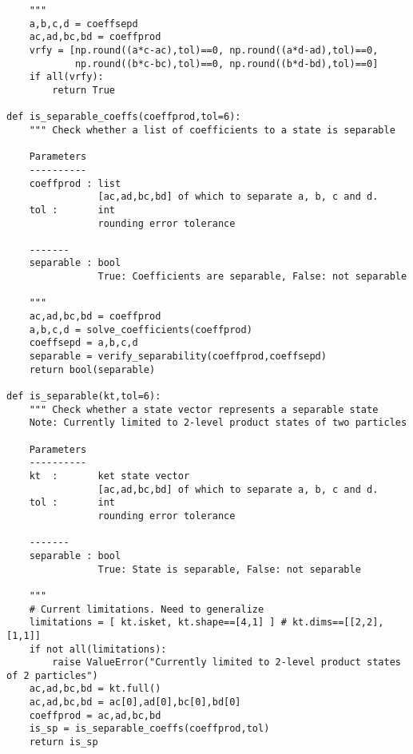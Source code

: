 \begin{verbatim}
    """
    a,b,c,d = coeffsepd
    ac,ad,bc,bd = coeffprod
    vrfy = [np.round((a*c-ac),tol)==0, np.round((a*d-ad),tol)==0,
            np.round((b*c-bc),tol)==0, np.round((b*d-bd),tol)==0]
    if all(vrfy):
        return True
        
def is_separable_coeffs(coeffprod,tol=6):
    """ Check whether a list of coefficients to a state is separable
    
    Parameters
    ----------
    coeffprod : list
                [ac,ad,bc,bd] of which to separate a, b, c and d.
    tol :       int
                rounding error tolerance
    
    -------
    separable : bool
                True: Coefficients are separable, False: not separable
    
    """
    ac,ad,bc,bd = coeffprod
    a,b,c,d = solve_coefficients(coeffprod)
    coeffsepd = a,b,c,d
    separable = verify_separability(coeffprod,coeffsepd)
    return bool(separable)
    
def is_separable(kt,tol=6):
    """ Check whether a state vector represents a separable state
    Note: Currently limited to 2-level product states of two particles
    
    Parameters
    ----------
    kt  :       ket state vector
                [ac,ad,bc,bd] of which to separate a, b, c and d.
    tol :       int
                rounding error tolerance
    
    -------
    separable : bool
                True: State is separable, False: not separable
    
    """
    # Current limitations. Need to generalize
    limitations = [ kt.isket, kt.shape==[4,1] ] # kt.dims==[[2,2],[1,1]]
    if not all(limitations):
        raise ValueError("Currently limited to 2-level product states of 2 particles")
    ac,ad,bc,bd = kt.full()
    ac,ad,bc,bd = ac[0],ad[0],bc[0],bd[0]
    coeffprod = ac,ad,bc,bd
    is_sp = is_separable_coeffs(coeffprod,tol)
    return is_sp
\end{verbatim}

